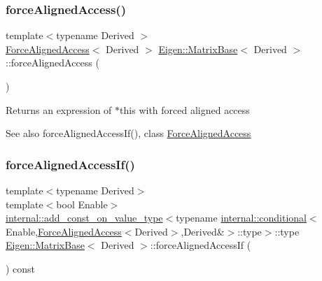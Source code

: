 \subsubsection{\texorpdfstring{forceAlignedAccess()}{forceAlignedAccess()}\hspace{0.1cm}{\footnotesize\ttfamily [2/2]}}
{\footnotesize\ttfamily template$<$typename Derived $>$ \\
\mbox{\hyperlink{class_eigen_1_1_force_aligned_access}{Force\+Aligned\+Access}}$<$ Derived $>$ \mbox{\hyperlink{class_eigen_1_1_matrix_base}{Eigen\+::\+Matrix\+Base}}$<$ Derived $>$\+::force\+Aligned\+Access (\begin{DoxyParamCaption}{ }\end{DoxyParamCaption})\hspace{0.3cm}{\ttfamily [inline]}}

\begin{DoxyReturn}{Returns}
an expression of $\ast$this with forced aligned access 
\end{DoxyReturn}
\begin{DoxySeeAlso}{See also}
force\+Aligned\+Access\+If(), class \mbox{\hyperlink{class_eigen_1_1_force_aligned_access}{Force\+Aligned\+Access}} 
\end{DoxySeeAlso}
\mbox{\label{class_eigen_1_1_matrix_base_af42d92f115d4b8fa3d5aa731ed496ed1}} 
\subsubsection{\texorpdfstring{forceAlignedAccessIf()}{forceAlignedAccessIf()}\hspace{0.1cm}{\footnotesize\ttfamily [1/2]}}
{\footnotesize\ttfamily template$<$typename Derived$>$ \\
template$<$bool Enable$>$ \\
\mbox{\hyperlink{struct_eigen_1_1internal_1_1add__const__on__value__type}{internal\+::add\+\_\+const\+\_\+on\+\_\+value\+\_\+type}}$<$typename \mbox{\hyperlink{struct_eigen_1_1internal_1_1conditional}{internal\+::conditional}}$<$Enable,\mbox{\hyperlink{class_eigen_1_1_force_aligned_access}{Force\+Aligned\+Access}}$<$Derived$>$,Derived\&$>$\+::type$>$\+::type \mbox{\hyperlink{class_eigen_1_1_matrix_base}{Eigen\+::\+Matrix\+Base}}$<$ Derived $>$\+::force\+Aligned\+Access\+If (\begin{DoxyParamCaption}{ }\end{DoxyParamCaption}) const\hspace{0.3cm}{\ttfamily [inline]}}

